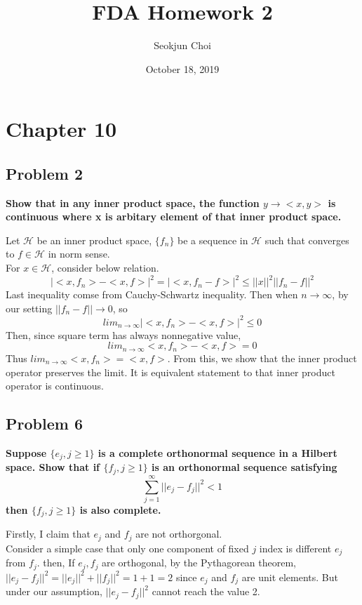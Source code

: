 \documentclass{article}
\begin{document}
\title{FDA Homework 2}
\author{Seokjun Choi}
\date{October 18, 2019}
\maketitle

\section{Chapter 10}
\subsection{Problem 2}

\textbf{
Show that in any inner product space, the function $y\rightarrow<x,y>$ is continuous where x is arbitary element of that inner product space.
}

Let $\mathcal{H}$ be an inner product space, \(\{f_n\}\) be a sequence in $\mathcal{H}$
such that converges to $f\in\mathcal{H}$ in norm sense. \\
For $x\in\mathcal{H}$, consider below relation.
\[|<x, f_n>-<x,f>|^2 = |<x, f_n-f>|^2 \leq ||x||^2||f_n-f||^2\]
Last inequality comse from Cauchy-Schwartz inequality. Then when $n\rightarrow\infty$, by our setting $||f_n-f||\rightarrow0$, so
\[lim_{n\rightarrow\infty}|<x, f_n>-<x,f>|^2\leq 0\]
Then, since square term has always nonnegative value,
\[lim_{n\rightarrow\infty}<x, f_n>-<x,f>= 0\]
Thus \(lim_{n\rightarrow\infty}<x, f_n> = <x,f>\). From this, we show that the inner product operator preserves the limit.
It is equivalent statement to that inner product operator is continuous.


\subsection{Problem 6}
\textbf{
    Suppose $\{e_j,j\geq 1\}$ is a complete orthonormal sequence in a Hilbert space. 
    Show that if $\{f_j,j\geq 1\}$ is an orthonormal sequence satisfying
    \[\sum_{j=1}^\infty ||e_j-f_j||^2<1\]
    then $\{f_j,j\geq 1\}$ is also complete.
}

Firstly, I claim that $e_j$ and $f_j$ are not orthorgonal. \\
Consider a simple case that only one component of fixed $j$ index is different $e_j$ from $f_j$. then,
If $e_j, f_j$ are orthogonal, by the Pythagorean theorem, $||e_j-f_j||^2=||e_j||^2+||f_j||^2=1+1=2$
since $e_j$ and $f_j$ are unit elements. But under our assumption, $||e_j-f_j||^2$ cannot reach the value 2.
\end{document}
